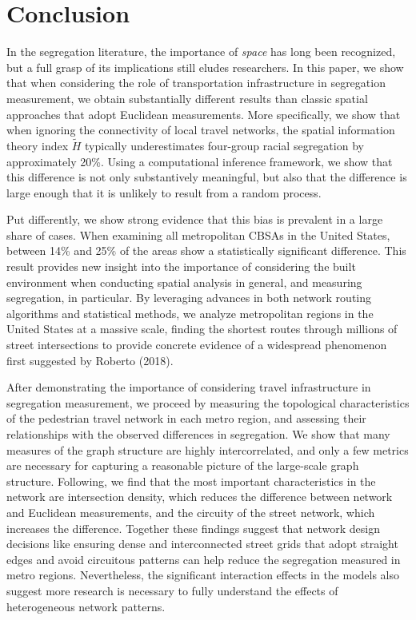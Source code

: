 \documentclass[
  10pt,
]{article}
\begin{document}
\hypertarget{conclusion}{%
\section{Conclusion}\label{conclusion}}

In the segregation literature, the importance of \emph{space} has long
been recognized, but a full grasp of its implications still eludes
researchers. In this paper, we show that when considering the role of
transportation infrastructure in segregation measurement, we obtain
substantially different results than classic spatial approaches that
adopt Euclidean measurements. More specifically, we show that when
ignoring the connectivity of local travel networks, the spatial
information theory index \(\tilde{H}\) typically underestimates
four-group racial segregation by approximately 20\%. Using a
computational inference framework, we show that this difference is not
only substantively meaningful, but also that the difference is large
enough that it is unlikely to result from a random process.

Put differently, we show strong evidence that this bias is prevalent in
a large share of cases. When examining all metropolitan CBSAs in the
United States, between 14\% and 25\% of the areas show a statistically
significant difference. This result provides new insight into the
importance of considering the built environment when conducting spatial
analysis in general, and measuring segregation, in particular. By
leveraging advances in both network routing algorithms and statistical
methods, we analyze metropolitan regions in the United States at a
massive scale, finding the shortest routes through millions of street
intersections to provide concrete evidence of a widespread phenomenon
first suggested by Roberto (2018).

After demonstrating the importance of considering travel infrastructure
in segregation measurement, we proceed by measuring the topological
characteristics of the pedestrian travel network in each metro region,
and assessing their relationships with the observed differences in
segregation. We show that many measures of the graph structure are
highly intercorrelated, and only a few metrics are necessary for
capturing a reasonable picture of the large-scale graph structure.
Following, we find that the most important characteristics in the
network are intersection density, which reduces the difference between
network and Euclidean measurements, and the circuity of the street
network, which increases the difference. Together these findings suggest
that network design decisions like ensuring dense and interconnected
street grids that adopt straight edges and avoid circuitous patterns can
help reduce the segregation measured in metro regions. Nevertheless, the
significant interaction effects in the models also suggest more research
is necessary to fully understand the effects of heterogeneous network
patterns.
\end{document}
